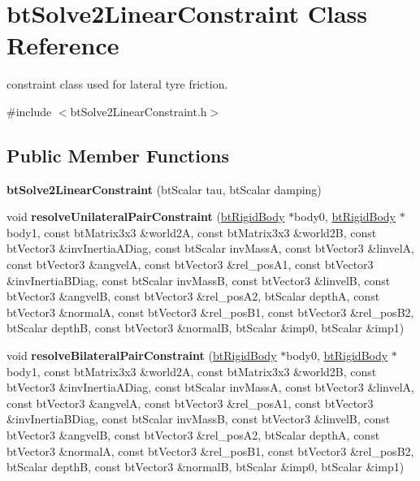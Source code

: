 \hypertarget{classbt_solve2_linear_constraint}{\section{bt\+Solve2\+Linear\+Constraint Class Reference}
\label{classbt_solve2_linear_constraint}
}


constraint class used for lateral tyre friction.  




{\ttfamily \#include $<$bt\+Solve2\+Linear\+Constraint.\+h$>$}

\subsection*{Public Member Functions}
\begin{DoxyCompactItemize}
\item 
\hypertarget{classbt_solve2_linear_constraint_a69f16e10c3f4d30be471deedd7a2c7ff}{{\bfseries bt\+Solve2\+Linear\+Constraint} (bt\+Scalar tau, bt\+Scalar damping)}\label{classbt_solve2_linear_constraint_a69f16e10c3f4d30be471deedd7a2c7ff}

\item 
\hypertarget{classbt_solve2_linear_constraint_af9e0bed2969536107cef14aa07dfef63}{void {\bfseries resolve\+Unilateral\+Pair\+Constraint} (\hyperlink{classbt_rigid_body}{bt\+Rigid\+Body} $\ast$body0, \hyperlink{classbt_rigid_body}{bt\+Rigid\+Body} $\ast$body1, const bt\+Matrix3x3 \&world2\+A, const bt\+Matrix3x3 \&world2\+B, const bt\+Vector3 \&inv\+Inertia\+A\+Diag, const bt\+Scalar inv\+Mass\+A, const bt\+Vector3 \&linvel\+A, const bt\+Vector3 \&angvel\+A, const bt\+Vector3 \&rel\+\_\+pos\+A1, const bt\+Vector3 \&inv\+Inertia\+B\+Diag, const bt\+Scalar inv\+Mass\+B, const bt\+Vector3 \&linvel\+B, const bt\+Vector3 \&angvel\+B, const bt\+Vector3 \&rel\+\_\+pos\+A2, bt\+Scalar depth\+A, const bt\+Vector3 \&normal\+A, const bt\+Vector3 \&rel\+\_\+pos\+B1, const bt\+Vector3 \&rel\+\_\+pos\+B2, bt\+Scalar depth\+B, const bt\+Vector3 \&normal\+B, bt\+Scalar \&imp0, bt\+Scalar \&imp1)}\label{classbt_solve2_linear_constraint_af9e0bed2969536107cef14aa07dfef63}

\item 
\hypertarget{classbt_solve2_linear_constraint_a65e9392ff0210dee03ae4503b5a9f9b0}{void {\bfseries resolve\+Bilateral\+Pair\+Constraint} (\hyperlink{classbt_rigid_body}{bt\+Rigid\+Body} $\ast$body0, \hyperlink{classbt_rigid_body}{bt\+Rigid\+Body} $\ast$body1, const bt\+Matrix3x3 \&world2\+A, const bt\+Matrix3x3 \&world2\+B, const bt\+Vector3 \&inv\+Inertia\+A\+Diag, const bt\+Scalar inv\+Mass\+A, const bt\+Vector3 \&linvel\+A, const bt\+Vector3 \&angvel\+A, const bt\+Vector3 \&rel\+\_\+pos\+A1, const bt\+Vector3 \&inv\+Inertia\+B\+Diag, const bt\+Scalar inv\+Mass\+B, const bt\+Vector3 \&linvel\+B, const bt\+Vector3 \&angvel\+B, const bt\+Vector3 \&rel\+\_\+pos\+A2, bt\+Scalar depth\+A, const bt\+Vector3 \&normal\+A, const bt\+Vector3 \&rel\+\_\+pos\+B1, const bt\+Vector3 \&rel\+\_\+pos\+B2, bt\+Scalar depth\+B, const bt\+Vector3 \&normal\+B, bt\+Scalar \&imp0, bt\+Scalar \&imp1)}\label{classbt_solve2_linear_constraint_a65e9392ff0210dee03ae4503b5a9f9b0}


\end{DoxyCompactItemize}
